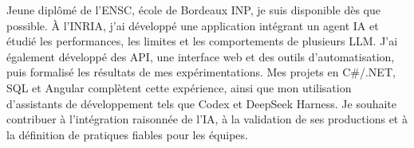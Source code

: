 
\begin{cvparagraph}
Jeune diplômé de l’ENSC, école de Bordeaux INP, je suis disponible dès que possible. À l’INRIA, j’ai développé une application intégrant un agent IA et étudié les performances, les limites et les comportements de plusieurs LLM. J’ai également développé des API, une interface web et des outils d’automatisation, puis formalisé les résultats de mes expérimentations. Mes projets en C\#/.NET, SQL et Angular complètent cette expérience, ainsi que mon utilisation d’assistants de développement tels que Codex et DeepSeek Harness. Je souhaite contribuer à l’intégration raisonnée de l’IA, à la validation de ses productions et à la définition de pratiques fiables pour les équipes.
\end{cvparagraph}
